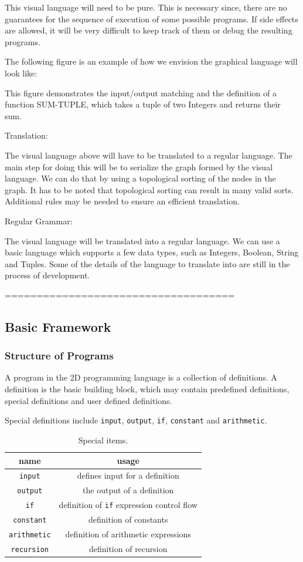 \documentclass[12pt,UTF8,a4]{article}
\newcommand{\code}[1]{\texttt{#1}}
\begin{document}
This visual language will need to be pure. This is necessary since,
there are no guarantees for the sequence of execution of some possible
programs. If side effects are allowed, it will be very difficult to
keep track of them or debug the resulting programs.

The following figure is an example of how we envision the graphical
language will look like:

This figure demonstrates the input/output matching and the definition
of a function SUM-TUPLE, which takes a tuple of two Integers and
returns their sum.

Translation:

The visual language above will have to be translated to a regular
language. The main step for doing this will be to serialize the graph
formed by the visual language. We can do that by using a topological
sorting of the nodes in the graph. It has to be noted that topological
sorting can result in many valid sorts. Additional rules may be needed
to ensure an efficient translation.


Regular Grammar:

The visual language will be translated into a regular language. We can use a basic language which  supports a few data types, such as Integers, Boolean, String and Tuples. Some of the details of the language to translate into are still in the process of development.

====================================

\subsection{Basic Framework}
\subsubsection{Structure of Programs}
A program in the 2D programming language is a collection of definitions. A definition is the basic building block, which may contain predefined definitions, special definitions and user defined definitions.

Special definitions include \code{input}, \code{output}, \code{if}, \code{constant} and \code{arithmetic}.
\begin{table}[!ht]
\center
\begin{tabular}{c|c}
\hline
name & usage \\
\hline
\code{input} & defines input for a definition\\
\code{output} & the output of a definition\\
\code{if} & definition of \code{if} expression control flow \\
\code{constant} & definition of constants \\
\code{arithmetic} & definition of arithmetic expressions \\
\code{recursion} & definition of recursion\\
\hline
\end{tabular}
\caption{Special items.}\label{tab:sitems}
\end{table}
\end{document}
